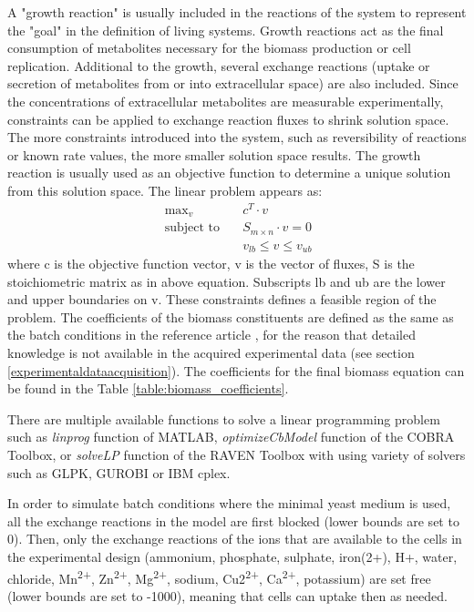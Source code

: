 A "growth reaction" is usually included in the reactions of the system to represent the "goal" in the definition of living systems. Growth reactions act as the final consumption of metabolites necessary for the biomass production or cell replication. Additional to the growth, several exchange reactions (uptake or secretion of metabolites from or into extracellular space) are also included. Since the concentrations of extracellular metabolites are measurable experimentally, constraints can be applied to exchange reaction fluxes to shrink solution space. The more constraints introduced into the system, such as reversibility of reactions or known rate values, the more smaller solution space results. The growth reaction is usually used as an objective function to determine a unique solution from this solution space. The linear problem appears as:
\begin{align}
 \ \text{max}_v \quad & c^T \cdot v \\
 \label{eq:fba}
 \ \text{subject to} \quad & S_{m \times n} \cdot v=0 \\
 \ & v_{lb} \leq v \leq v_{ub}
\end{align}
\noindent where c is the objective function vector, v is the vector of fluxes, S is the stoichiometric matrix as in above equation. Subscripts lb and ub are the lower and upper boundaries on v. These constraints defines a feasible region of the problem. The coefficients of the biomass constituents are defined as the same as the batch conditions in the reference article \cite{nilsson2016metabolic}, for the reason that detailed knowledge is not available in the acquired experimental data (see section \ref{experimentaldataacquisition}). The coefficients for the final biomass equation can be found in the Table \ref{table:biomass_coefficients}.



There are multiple available functions to solve a linear programming problem such as \emph{linprog} function of MATLAB, \emph{optimizeCbModel} function of the COBRA Toolbox, or \emph{solveLP} function of the RAVEN Toolbox with using variety of solvers such as GLPK, GUROBI or IBM cplex.

In order to simulate batch conditions where the minimal yeast medium is used, all the exchange reactions in the model are first blocked (lower bounds are set to 0). Then, only the exchange reactions of the ions that are available to the cells in the experimental design (ammonium, phosphate, sulphate, iron(2+), H+, water, chloride, Mn\textsuperscript{2+}, Zn\textsuperscript{2+}, Mg\textsuperscript{2+}, sodium, Cu2\textsuperscript{2+}, Ca\textsuperscript{2+}, potassium) are set free (lower bounds are set to -1000), meaning that cells can uptake then as needed.


